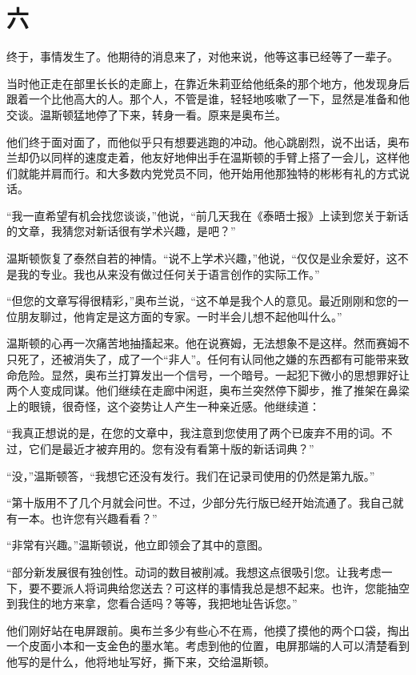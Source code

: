 \section*{六}\label{ux5341ux56db}

终于，事情发生了。他期待的消息来了，对他来说，他等这事已经等了一辈子。

当时他正走在部里长长的走廊上，在靠近朱莉亚给他纸条的那个地方，他发现身后跟着一个比他高大的人。那个人，不管是谁，轻轻地咳嗽了一下，显然是准备和他交谈。温斯顿猛地停了下来，转身一看。原来是奥布兰。

他们终于面对面了，而他似乎只有想要逃跑的冲动。他心跳剧烈，说不出话，奥布兰却仍以同样的速度走着，他友好地伸出手在温斯顿的手臂上搭了一会儿，这样他们就能并肩而行。和大多数内党党员不同，他开始用他那独特的彬彬有礼的方式说话。

``我一直希望有机会找您谈谈，''他说，``前几天我在《泰晤士报》上读到您关于新话的文章，我猜您对新话很有学术兴趣，是吧？''

温斯顿恢复了泰然自若的神情。``说不上学术兴趣，''他说，``仅仅是业余爱好，这不是我的专业。我也从来没有做过任何关于语言创作的实际工作。''

``但您的文章写得很精彩，''奥布兰说，``这不单是我个人的意见。最近刚刚和您的一位朋友聊过，他肯定是这方面的专家。一时半会儿想不起他叫什么。''

温斯顿的心再一次痛苦地抽搐起来。他在说赛姆，无法想象不是这样。然而赛姆不只死了，还被消失了，成了一个``非人''。任何有认同他之嫌的东西都有可能带来致命危险。显然，奥布兰打算发出一个信号，一个暗号。一起犯下微小的思想罪好让两个人变成同谋。他们继续在走廊中闲逛，奥布兰突然停下脚步，推了推架在鼻梁上的眼镜，很奇怪，这个姿势让人产生一种亲近感。他继续道：

``我真正想说的是，在您的文章中，我注意到您使用了两个已废弃不用的词。不过，它们是最近才被弃用的。您有没有看第十版的新话词典？''

``没，''温斯顿答，``我想它还没有发行。我们在记录司使用的仍然是第九版。''

``第十版用不了几个月就会问世。不过，少部分先行版已经开始流通了。我自己就有一本。也许您有兴趣看看？''

``非常有兴趣。''温斯顿说，他立即领会了其中的意图。

``部分新发展很有独创性。动词的数目被削减。我想这点很吸引您。让我考虑一下，要不要派人将词典给您送去？可这样的事情我总是想不起来。也许，您能抽空到我住的地方来拿，您看合适吗？等等，我把地址告诉您。''

他们刚好站在电屏跟前。奥布兰多少有些心不在焉，他摸了摸他的两个口袋，掏出一个皮面小本和一支金色的墨水笔。考虑到他的位置，电屏那端的人可以清楚看到他写的是什么，他将地址写好，撕下来，交给温斯顿。

